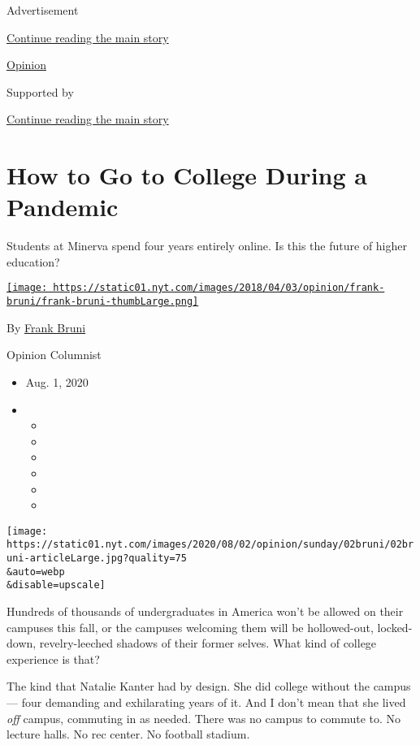 Advertisement

\protect\hyperlink{after-top}{Continue reading the main story}

\href{/section/opinion}{Opinion}

Supported by

\protect\hyperlink{after-sponsor}{Continue reading the main story}

\hypertarget{how-to-go-to-college-during-a-pandemic}{%
\section{How to Go to College During a
Pandemic}\label{how-to-go-to-college-during-a-pandemic}}

Students at Minerva spend four years entirely online. Is this the future
of higher education?

\href{https://www.nytimes.com/by/frank-bruni}{\texttt{[image: https://static01.nyt.com/images/2018/04/03/opinion/frank-bruni/frank-bruni-thumbLarge.png]}}

By \href{https://www.nytimes.com/by/frank-bruni}{Frank Bruni}

Opinion Columnist

\begin{itemize}
\item
  Aug. 1, 2020
\item
  \begin{itemize}
  \item
  \item
  \item
  \item
  \item
  \item
  \end{itemize}
\end{itemize}

\texttt{[image: https://static01.nyt.com/images/2020/08/02/opinion/sunday/02bruni/02bruni-articleLarge.jpg?quality=75\\\&auto=webp\\\&disable=upscale]}

Hundreds of thousands of undergraduates in America won't be allowed on
their campuses this fall, or the campuses welcoming them will be
hollowed-out, locked-down, revelry-leeched shadows of their former
selves. What kind of college experience is that?

The kind that Natalie Kanter had by design. She did college without the
campus --- four demanding and exhilarating years of it. And I don't mean
that she lived \emph{off} campus, commuting in as needed. There was no
campus to commute to. No lecture halls. No rec center. No football
stadium.

